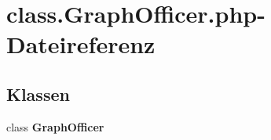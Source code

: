 \section{class.GraphOfficer.php-Dateireferenz}
\label{class_8GraphOfficer_8php}
\subsection*{Klassen}
\begin{CompactItemize}
\item 
class {\bf GraphOfficer}
\end{CompactItemize}
